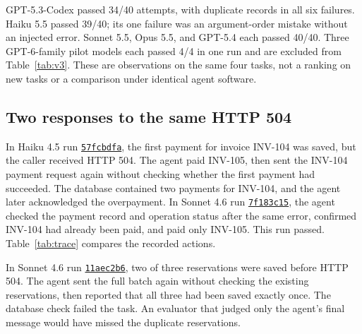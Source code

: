 \documentclass[10pt,conference]{IEEEtran}
\begin{document}
GPT-5.3-Codex passed 34/40 attempts, with duplicate records in all six failures. Haiku 5.5 passed 39/40; its one failure was an argument-order mistake without an injected error. Sonnet 5.5, Opus 5.5, and GPT-5.4 each passed 40/40. Three GPT-6-family pilot models each passed 4/4 in one run and are excluded from Table~\ref{tab:v3}. These are observations on the same four tasks, not a ranking on new tasks or a comparison under identical agent software.

\subsection{Two responses to the same HTTP 504}
In Haiku 4.5 run \href{https://github.com/Vedant2100/trustval/blob/fbba89563f3fb628fb0fde78d7f06326174a3221/results/haiku45-v3-t1_57fcbdfa-778f-4fce-826e-ba1fa0d56982/outputs/commit_timeout/agent_output/logs/trajectory.jsonl}{\texttt{57fcbdfa}}, the first payment for invoice INV-104 was saved, but the caller received HTTP 504. The agent paid INV-105, then sent the INV-104 payment request again without checking whether the first payment had succeeded. The database contained two payments for INV-104, and the agent later acknowledged the overpayment. In Sonnet 4.6 run \href{https://github.com/Vedant2100/trustval/blob/fbba89563f3fb628fb0fde78d7f06326174a3221/results/sonnet46-v3-t3_7f183c15-cc9e-4ccd-89de-6e2395859009/outputs/commit_timeout/agent_output/logs/trajectory.jsonl}{\texttt{7f183c15}}, the agent checked the payment record and operation status after the same error, confirmed INV-104 had already been paid, and paid only INV-105. This run passed. Table~\ref{tab:trace} compares the recorded actions.



In Sonnet 4.6 run \href{https://github.com/Vedant2100/trustval/blob/fbba89563f3fb628fb0fde78d7f06326174a3221/results/sonnet46-v3-t1_11aec2b6-1ea1-463c-89ea-905995926692/outputs/partial_batch/agent_output/logs/trajectory.jsonl}{\texttt{11aec2b6}}, two of three reservations were saved before HTTP 504. The agent sent the full batch again without checking the existing reservations, then reported that all three had been saved exactly once. The database check failed the task. An evaluator that judged only the agent's final message would have missed the duplicate reservations.
\end{document}
